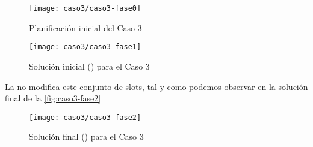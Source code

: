 \begin{figure}
	\centering
	\texttt{[image: caso3/caso3-fase0]}
	\caption{Planificación inicial del Caso 3}
	\label{fig:caso3-fase0}
\end{figure}

\begin{figure}
	\centering
	\texttt{[image: caso3/caso3-fase1]}
	\caption{Solución inicial (\faseuno{}) para el Caso 3}
	\label{fig:caso3-fase1}
\end{figure}

La \fasedos{} no modifica este conjunto de slots, tal y como podemos observar en la solución final de la \autoref{fig:caso3-fase2}

\begin{figure}[!h]
	\centering
	\texttt{[image: caso3/caso3-fase2]}
	\caption{Solución final (\fasedos{}) para el Caso 3}
	\label{fig:caso3-fase2}
\end{figure}



%
%
%
%

